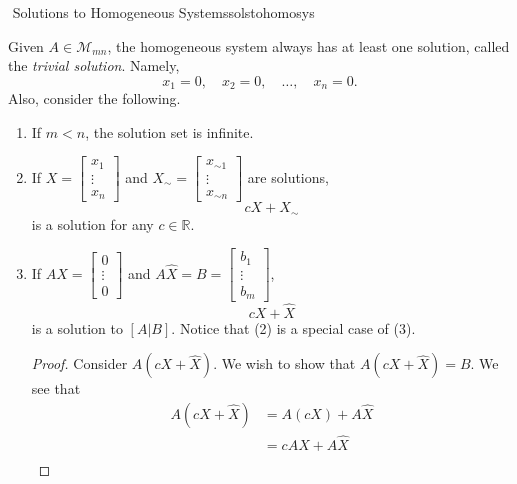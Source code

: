     \begin{theorem}{\Stop\,\,Solutions to Homogeneous Systems}{solstohomosys}
    
        Given \(A\in\mathcal{M}_{mn}\), the homogeneous system always has at least one solution, called the \textit{trivial solution}. Namely,
        \begin{equation*}
            x_1=0,\quad x_2=0,\quad\ldots,\quad x_n=0.
        \end{equation*}
        Also, consider the following.
        \begin{enumerate}
            \item If \(m<n\), the solution set is infinite. 
            \item If \(X=\begin{bmatrix} x_1 \\ \vdots \\ x_n \end{bmatrix}\) and \(X_\sim=\begin{bmatrix} x_{\sim 1} \\ \vdots \\ x_{\sim n} \end{bmatrix}\) are solutions,
            \begin{equation*}
                cX+X_\sim
            \end{equation*}
            is a solution for any \(c\in\mathbb{R}\).
            \item If \(AX=\begin{bmatrix} 0 \\ \vdots \\ 0 \end{bmatrix}\) and \(A\hat{X}=B=\begin{bmatrix} b_1 \\ \vdots \\ b_m \end{bmatrix}\),
            \begin{equation*}
                cX+\hat{X}
            \end{equation*}
            is a solution to \([A|B]\). Notice that (2) is a special case of (3).
            \begin{proof}
                Consider \(A(cX+\hat{X})\). We wish to show that \(A(cX+\hat{X})=B\). We see that
                \begin{align*}
                    A(cX+\hat{X})&=A(cX)+A\hat{X} \\
                    &=cAX+A\hat{X} \\

\end{align*}
\end{proof}
\end{enumerate}
\end{theorem}
